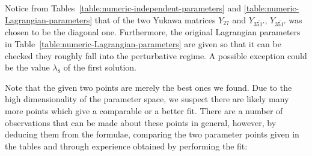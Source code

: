 \documentclass[a4paper,12pt]{article}
\def\yd{Y_{27}}
\def\yt{Y_{\overline{351'}}}
\begin{document}
Notice from Tables~\ref{table:numeric-independent-parameters} and \ref{table:numeric-Lagrangian-parameters} that of the two Yukawa matrices $\yd$ and $\yt$, $\yt$ was chosen to be the diagonal one. Furthermore, the original Lagrangian parameters in Table~\ref{table:numeric-Lagrangian-parameters} are given so that it can be checked they roughly fall into the perturbative regime. A possible
exception could be the value $\lambda_8$ of the first solution.

Note that the given two points are merely the best ones we found. Due to the high dimensionality of the parameter space, we suspect there are likely many more points which give a comparable or a better fit. There are a number of observations that can be made about these points in general, however, by deducing them from the formulae, comparing the two parameter points given in the tables and through experience  obtained by  performing the fit:
\end{document}
